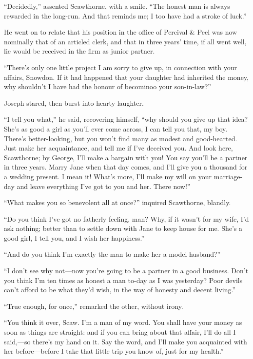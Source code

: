 ``Decidedly,'' assented Scawthorne, with a smile. ``The honest man is
always rewarded in the long-run. And that reminds me; I too have had a
stroke of luck.''

He went on to relate that his position in the office of Percival \& Peel
was now nominally that of an articled clerk, and that in three {}years'
time, if all went well, lie would be received in the firm as junior
partner.

``There's only one little project I am sorry to give up, in connection
with your affairs, Snowdon. If it had happened that your daughter had
inherited the money, why shouldn't I have had the honour of becominoo
your son-in-law?''

Joseph stared, then burst into hearty laughter.

``I tell you what,'' he said, recovering himself, ``why should you give
up that idea? She's as good a girl as you'll ever come across, I can
tell you that, my boy. There's better-looking, but you won't find many
as modest and good-hearted. Just make her acquaintance, and tell me if
I've deceived you. And look here, Scawthorne; by George, I'll make a
bargain with you! You say you'll be a partner in three years. Marry Jane
when that day comes, and I'll give you a thousand for a wedding present.
I mean it! What's more, I'll make my will on your marriage- day and
leave everything I've got to you and her. There now!''

``What makes you so benevolent all at once?'' inquired Scawthorne,
blandly.

{}``Do you think I've got no fatherly feeling, man? Why, if it wasn't
for my wife, I'd ask nothing; better than to settle down with Jane to
keep house for me. She's a good girl, I tell you, and I wish her
happiness.''

``And do you think I'm exactly the man to make her a model husband?''

``I don't see why not---now you're going to be a partner in a good
business. Don't you think I'm ten times as honest a man to-day as I was
yesterday? Poor devils can't afford to be what they'd wish, in the way
of honesty and decent living.''

``True enough, for once,'' remarked the other, without irony.

``You think it over, Scaw. I'm a man of my word. You shall have your
money as soon as things are straight: and if you can bring about that
affair, I'll do all I said,---so there's my hand on it. Say the word,
and I'll make you acquainted with her before---before I take that little
trip you know of, just for my health.''


